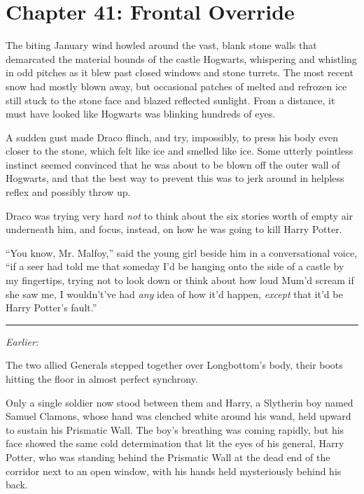 \chapter{Chapter 41: Frontal Override}
The biting January wind howled around the vast, blank stone walls that demarcated the material bounds of the castle Hogwarts, whispering and whistling in odd pitches as it blew past closed windows and stone turrets. The most recent snow had mostly blown away, but occasional patches of melted and refrozen ice still stuck to the stone face and blazed reflected sunlight. From a distance, it must have looked like Hogwarts was blinking hundreds of eyes.

A sudden gust made Draco flinch, and try, impossibly, to press his body even closer to the stone, which felt like ice and smelled like ice. Some utterly pointless instinct seemed convinced that he was about to be blown off the outer wall of Hogwarts, and that the best way to prevent this was to jerk around in helpless reflex and possibly throw up.

Draco was trying very hard \emph{not} to think about the six stories worth of empty air underneath him, and focus, instead, on how he was going to kill Harry Potter.

``You know, Mr. Malfoy,'' said the young girl beside him in a conversational voice, ``if a seer had told me that someday I'd be hanging onto the side of a castle by my fingertips, trying not to look down or think about how loud Mum'd scream if she saw me, I wouldn't've had \emph{any} idea of how it'd happen, \emph{except} that it'd be Harry Potter's fault.''

\begin{center}\rule{3in}{0.4pt}\end{center}

\emph{Earlier:}

The two allied Generals stepped together over Longbottom's body, their boots hitting the floor in almost perfect synchrony.

Only a single soldier now stood between them and Harry, a Slytherin boy named Samuel Clamons, whose hand was clenched white around his wand, held upward to sustain his Prismatic Wall. The boy's breathing was coming rapidly, but his face showed the same cold determination that lit the eyes of his general, Harry Potter, who was standing behind the Prismatic Wall at the dead end of the corridor next to an open window, with his hands held mysteriously behind his back.

